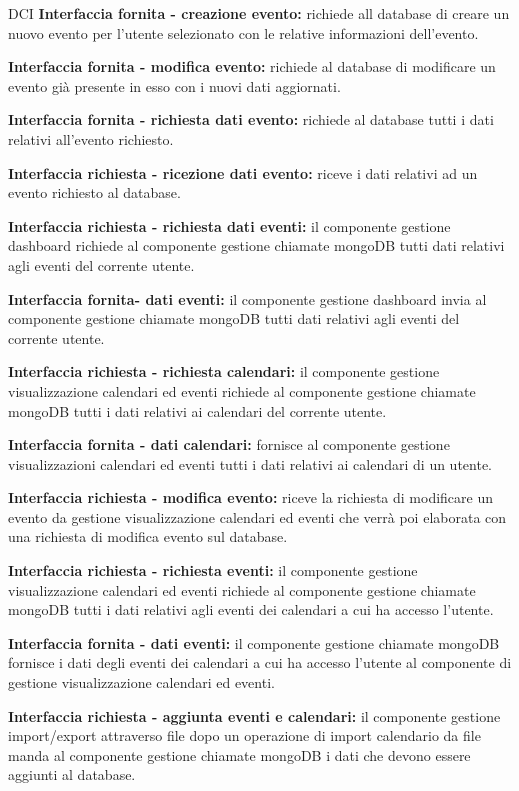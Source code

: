 \begin{listaPersonale}{DCI}
    \textbf{Interfaccia fornita - creazione evento:} richiede all database di creare un nuovo evento per l'utente selezionato con le relative informazioni dell'evento.

    \textbf{Interfaccia fornita - modifica evento:} richiede al database di modificare un evento già presente in esso con i nuovi dati aggiornati.

    \textbf{Interfaccia fornita - richiesta dati evento:} richiede al database tutti i dati relativi all'evento richiesto.

    \textbf{Interfaccia richiesta - ricezione dati evento:} riceve i dati relativi ad un evento richiesto al database.

    \textbf{Interfaccia richiesta - richiesta dati eventi:} il componente gestione dashboard richiede al componente gestione chiamate mongoDB tutti dati relativi agli eventi del corrente utente.

    \textbf{Interfaccia fornita- dati eventi:} il componente gestione dashboard invia al componente gestione chiamate mongoDB tutti dati relativi agli eventi del corrente utente.

    \textbf{Interfaccia richiesta - richiesta calendari:} il componente gestione visualizzazione calendari ed eventi richiede al componente gestione chiamate mongoDB tutti i dati relativi ai calendari del corrente utente.

    \textbf{Interfaccia fornita - dati calendari:} fornisce al componente gestione visualizzazioni calendari ed eventi tutti i dati relativi ai calendari di un utente.

    \textbf{Interfaccia richiesta - modifica evento:} riceve la richiesta di modificare un evento da gestione visualizzazione calendari ed eventi che verrà poi elaborata con una richiesta di modifica evento sul database.

    \textbf{Interfaccia richiesta - richiesta eventi:} il componente gestione visualizzazione calendari ed eventi richiede al componente gestione chiamate mongoDB tutti i dati relativi agli eventi dei calendari a cui ha accesso l'utente.

    \textbf{Interfaccia fornita - dati eventi:} il componente gestione chiamate mongoDB fornisce i dati degli eventi dei calendari a cui ha accesso l'utente al componente di gestione visualizzazione calendari ed eventi.

    \textbf{Interfaccia richiesta - aggiunta eventi e calendari:} il componente gestione import/export attraverso file dopo un operazione di import calendario da file manda al componente gestione chiamate mongoDB i dati che devono essere aggiunti al database.


\end{listaPersonale}
